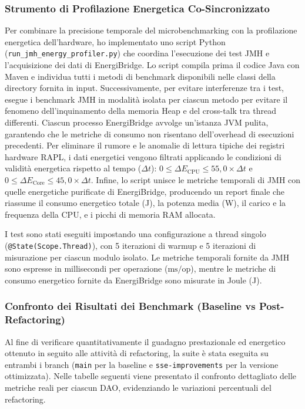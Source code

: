 \subsubsection{Strumento di Profilazione Energetica Co-Sincronizzato}

Per combinare la precisione temporale del microbenchmarking con la profilazione energetica dell'hardware, ho implementato uno script Python (\texttt{run\_jmh\_energy\_profiler.py}) che coordina l'esecuzione dei test JMH e l'acquisizione dei dati di EnergiBridge. Lo script compila prima il codice Java con Maven e individua tutti i metodi di benchmark disponibili nelle classi della directory fornita in input. Successivamente, per evitare interferenze tra i test, esegue i benchmark JMH in modalità isolata per ciascun metodo per evitare il fenomeno dell'inquinamento della memoria Heap e del cross-talk tra thread differenti. Ciascun processo EnergiBridge avvolge un'istanza JVM pulita, garantendo che le metriche di consumo non risentano dell'overhead di esecuzioni precedenti. Per eliminare il rumore e le anomalie di lettura tipiche dei registri hardware RAPL, i dati energetici vengono filtrati applicando le condizioni di validità energetica rispetto al tempo ($\Delta t$): $0 \le \Delta E_{\text{CPU}} \le 55{,}0 \times \Delta t$ e $0 \le \Delta E_{\text{Core}} \le 45{,}0 \times \Delta t$. Infine, lo script unisce le metriche temporali di JMH con quelle energetiche purificate di EnergiBridge, producendo un report finale che riassume il consumo energetico totale (J), la potenza media (W), il carico e la frequenza della CPU, e i picchi di memoria RAM allocata.

I test sono stati eseguiti impostando una configurazione a thread singolo (\texttt{@State(Scope.Thread)}), con 5 iterazioni di warmup e 5 iterazioni di misurazione per ciascun modulo isolato. Le metriche temporali fornite da JMH sono espresse in millisecondi per operazione ($\text{ms/op}$), mentre le metriche di consumo energetico fornite da EnergiBridge sono misurate in Joule (J).

\subsubsection{Confronto dei Risultati dei Benchmark (Baseline vs Post-Refactoring)}

Al fine di verificare quantitativamente il guadagno prestazionale ed energetico ottenuto in seguito alle attività di refactoring, la suite è stata eseguita su entrambi i branch (\texttt{main} per la baseline e \texttt{sse-improvements} per la versione ottimizzata). Nelle tabelle seguenti viene presentato il confronto dettagliato delle metriche reali per ciascun DAO, evidenziando le variazioni percentuali del refactoring.

